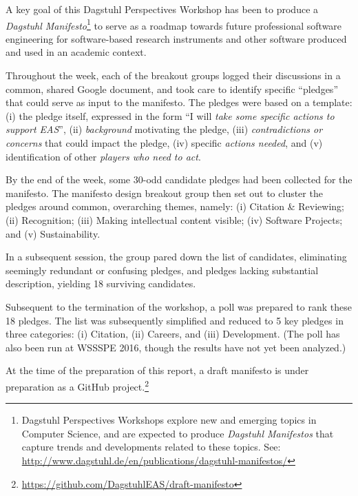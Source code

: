 \documentclass[a4paper,UKenglish]{dagrep}
\begin{document}

A key goal of this Dagstuhl Perspectives Workshop has been to produce a \emph{Dagstuhl Manifesto}\footnote{Dagstuhl Perspectives Workshops explore new and emerging topics in Computer Science, and are expected to produce \emph{Dagstuhl Manifestos} that capture trends and developments related to these topics. See: \url{http://www.dagstuhl.de/en/publications/dagstuhl-manifestos/}} to serve as a roadmap towards future professional software engineering for software-based research instruments and other software produced and used in an academic context.

Throughout the week, each of the breakout groups logged their discussions in a common, shared Google document, and took care to identify specific ``pledges'' that could serve as input to the manifesto. The pledges were based on a template: (i) the pledge itself, expressed in the form ``I will \emph{take some specific actions to support EAS}'', (ii) \emph{background} motivating the pledge, (iii) \emph{contradictions or concerns} that could impact the pledge, (iv) specific \emph{actions needed}, and (v) identification of other \emph{players who need to act}.

By the end of the week, some 30-odd candidate pledges had been collected for the manifesto.
The manifesto design breakout group then set out to cluster the pledges around common, overarching themes, namely:
(i) Citation \& Reviewing;
(ii) Recognition;
(iii) Making intellectual content visible;
(iv) Software Projects; and
(v) Sustainability.

In a subsequent session, the group pared down the list of candidates, eliminating seemingly redundant or confusing pledges, and pledges lacking substantial description, yielding 18 surviving candidates.

Subsequent to the termination of the workshop, a poll was prepared to rank these 18 pledges. The list was subsequently simplified and reduced to 5 key pledges in three categories: (i) Citation, (ii) Careers, and (iii) Development.
(The poll has also been run at WSSSPE 2016, though the results have not yet been analyzed.)

At the time of the preparation of this report, a draft manifesto is under preparation as a GitHub project.\footnote{\url{https://github.com/DagstuhlEAS/draft-manifesto}}


%


\end{document}
